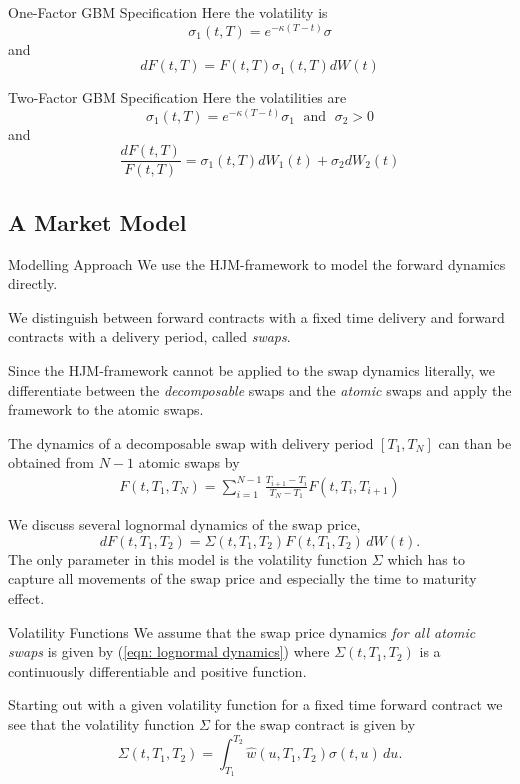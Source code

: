 One-Factor GBM Specification
	Here the volatility is
		$$
		\sigma_1(t,T)=e^{-\kappa (T-t)}\sigma
		$$
	and
		$$
		dF(t,T)=F(t,T)\sigma_1(t,T)dW(t)
		$$
		

Two-Factor GBM Specification
	Here the volatilities are
		$$
		\sigma_1(t,T)=e^{-\kappa (T-t)}\sigma_1 \; \mbox{ and } \; \sigma_2>0
		$$
	and
		$$
		\frac{dF(t,T)}{F(t,T)}=\sigma_1(t,T)dW_1(t)+\sigma_2dW_2(t)
		$$


\subsection{A Market Model}
Modelling Approach
	We use the HJM-framework to model the forward dynamics directly.
	
	We distinguish between forward contracts with a fixed time delivery 
	and forward contracts with a delivery period, called \emph{swaps}.
	
	Since the HJM-framework cannot be applied to the swap dynamics literally, 
	we differentiate between the \emph{decomposable} swaps and the \emph{atomic} 
	swaps and apply the framework to the atomic swaps.

	The dynamics of a decomposable swap with delivery period $[T_1,T_{N}]$ can than be obtained from $N-1$ atomic swaps by
	\begin{align}
	F(t,T_1,T_N)=\sum\limits_{i=1}^{N-1} \frac{T_{i+1}-T_i}{T_N-T_1} F(t,T_i,T_{i+1})\label{eqn: decomposbale swap}
	\end{align}

	We discuss several lognormal dynamics of the swap price,
		\begin{equation}
		dF(t,T_1,T_2)=\Sigma(t,T_1,T_2)F(t,T_1,T_2)\, dW(t). \label{eqn: lognormal dynamics}
		\end{equation}
	The only parameter in this model is the volatility function $\Sigma$ which has to capture all movements of the swap price and especially the time to maturity effect.


Volatility Functions
	We assume that the swap price dynamics \emph{for all atomic swaps} is given by (\ref{eqn: lognormal dynamics})
	where $\Sigma(t,T_1,T_2)$ is a continuously differentiable and positive function.

	Starting out with a given volatility function for a fixed time forward contract we see that the volatility function $\Sigma$ for the swap contract is given by
	\begin{equation}
	\Sigma(t,T_1,T_2)=\int_{T_1}^{T_2} \hat{w}(u,T_1,T_2) \sigma(t,u) \, du. \label{eqn: swap volatility creation}
	\end{equation}


